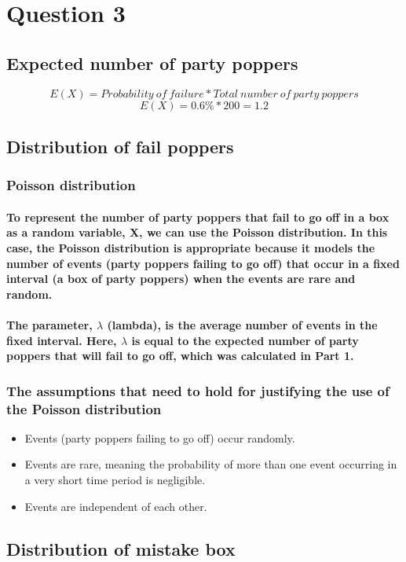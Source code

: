 \section{Question 3}
\subsection{Expected number of party poppers}
$$ E(X)=Probability\ of\ failure * Total\ number\ of\ party\ poppers $$
$$ E(X)=0.6\% *200=1.2 $$
% 
\subsection{Distribution of fail poppers}
\subsubsection{Poisson distribution}
\paragraph{To represent the number of party poppers that fail to go off in a box as a random variable, X, we can use the Poisson distribution. In this case, the Poisson distribution is appropriate because it models the number of events (party poppers failing to go off) that occur in a fixed interval (a box of party poppers) when the events are rare and random.}
% 
\paragraph{The parameter, $\lambda$ (lambda), is the average number of events in the fixed interval. Here, $\lambda$ is equal to the expected number of party poppers that will fail to go off, which was calculated in Part 1.}
% 
% 
\subsubsection{The assumptions that need to hold for justifying the use of the Poisson distribution}
\begin{itemize}
    \item Events (party poppers failing to go off) occur randomly.
    \item Events are rare, meaning the probability of more than one event occurring in a very short time period is negligible.
    \item Events are independent of each other.
\end{itemize}
% 
% 
% 
\subsection{Distribution of mistake box}
